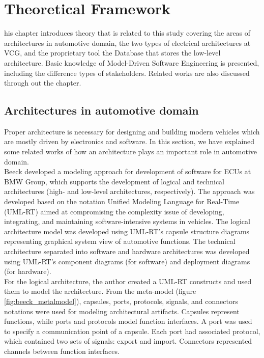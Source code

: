 \chapter{Theoretical Framework}

\lettrine[findent=2pt]{}{ }his chapter introduces theory that is related to this study covering the areas of architectures in automotive domain, the two types of electrical architectures at VCG, and the proprietary tool the Database that stores the low-level architecture. Basic knowledge of Model-Driven Software Engineering is presented, including the difference types of stakeholders. Related works are also discussed through out the chapter.

\section{Architectures in automotive domain}
Proper architecture is necessary for designing and building modern vehicles which are mostly driven by electronics and software. In this section, we have explained some related works of how an architecture plays an important role in automotive domain.\\

Beeck \cite{Beeck} developed a modeling approach for development of software for ECUs at BMW Group, which supports the development of logical and technical architectures (high- and low-level architectures, respectively). The approach was developed based on the notation Unified Modeling Language for Real-Time (UML-RT) aimed at compromising the complexity issue of developing, integrating, and maintaining software-intensive systems in vehicles. The logical architecture model was developed using UML-RT's capsule structure diagrams representing graphical system view of automotive functions. The technical architecture separated into software and hardware architectures was developed using UML-RT's component diagrams (for software) and deployment diagrams (for hardware). \\

For the logical architecture, the author created a UML-RT constructs and used them to model the architecture. From the meta-model (figure \ref{fig:beeck_metalmodel}), capsules, ports, protocols, signals, and connectors notations were used for modeling architectural artifacts. Capsules represent functions, while ports and protocols model function interfaces. A port was used to specify a communication point of a capsule. Each port had associated protocol, which contained two sets of signals: export and import. Connectors represented channels between function interfaces. \\

